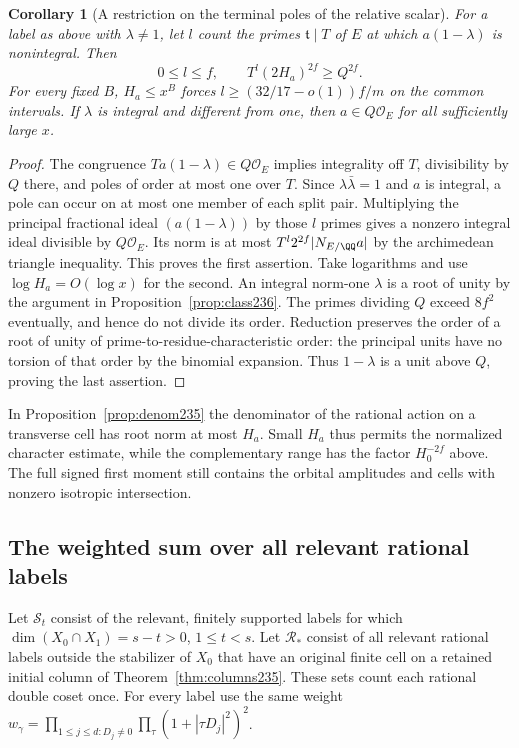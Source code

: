 \documentclass[a4paper,11pt]{article}
\newtheorem{corollary}[proposition]{Corollary}
\theoremstyle{definition}
\theoremstyle{remark}
\numberwithin{equation}{section}
\begin{document}
\begin{corollary}[A restriction on the terminal poles of the relative scalar]
\leavevmode\label{cor:poles236}
For a label as above with \(\lambda\ne1\), let \(l\) count the
primes \(\mathfrak t\mid T\) of \(E\) at which
\(a(1-\lambda)\) is nonintegral. Then
\[
           0\le l\le f,\qquad
           T^l(2H_a)^{2f}\ge Q^{2f}.
\]
For every fixed \(B\), \(H_a\le x^B\) forces
\(l\ge(32/17-o(1))f/m\) on the common intervals. If \(\lambda\)
is integral and different from one, then \(a\in Q\mathcal O_E\)
for all sufficiently large \(x\).
\end{corollary}
\begin{proof}
The congruence \(Ta(1-\lambda)\in Q\mathcal O_E\) implies
integrality off \(T\), divisibility by \(Q\) there, and poles
of order at most one over \(T\). Since \(\lambda\bar\lambda=1\)
and \(a\) is integral, a pole can occur on at most one member
of each split pair. Multiplying the principal fractional ideal
\((a(1-\lambda))\) by those \(l\) primes gives a nonzero integral
ideal divisible by \(Q\mathcal O_E\). Its norm is at most
\(T^l 2^{2f}|N_{E/\QQ}a|\) by the archimedean triangle
inequality. This proves the first assertion. Take logarithms
and use \(\log H_a=O(\log x)\) for the second.
An integral norm-one \(\lambda\) is a root of unity by the
argument in Proposition~\ref{prop:class236}. The primes
dividing \(Q\) exceed \(8f^2\) eventually, and hence do not
divide its order. Reduction preserves the order of a root
of unity of prime-to-residue-characteristic order: the
principal units have no torsion of that order by the binomial
expansion. Thus \(1-\lambda\) is a unit above \(Q\), proving
the last assertion.
\end{proof}

In Proposition~\ref{prop:denom235} the denominator of the
rational action on a transverse cell has root norm at most
\(H_a\). Small \(H_a\) thus permits the normalized character
estimate, while the complementary range has the factor
\(H_0^{-2f}\) above. The full signed first moment still
contains the orbital amplitudes and cells with nonzero
isotropic intersection.

\subsection{The weighted sum over all relevant rational labels}\label{nav:IX-32}
Let \(\mathcal S_t\) consist of the relevant, finitely supported
labels for which \(\dim(X_0\cap X_1)=s-t>0\), \(1\le t<s\).
Let \(\mathcal R_*\) consist of all relevant rational labels
outside the stabilizer of \(X_0\) that have an original finite
cell on a retained initial column of Theorem~\ref{thm:columns235}.
These sets count each rational double coset once. For every label
use the same weight
\(w_\gamma=\prod_{1\le j\le d:D_j\ne0}\prod_\tau
(1+|\tau D_j|^2)^2\).
\end{document}
